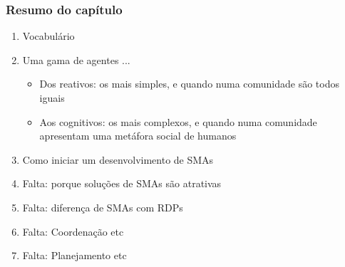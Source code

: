 
\begin{frame} %

 \frametitle{Resumo do capítulo}

\begin{enumerate}
  \item Vocabulário
  \item Uma gama de agentes ...
    \begin{itemize}
    \item Dos reativos: os mais simples, e quando numa comunidade são todos iguais
    \item Aos cognitivos: os mais complexos, e quando numa comunidade apresentam
    uma metáfora social de humanos
  \end{itemize}
  
  \item Como iniciar um desenvolvimento de SMAs 
  
  \item Falta: porque soluções de SMAs são atrativas
    \item Falta: diferença de SMAs com RDPs
    \item Falta: Coordenação etc
        \item Falta: Planejamento etc
    
\end{enumerate}


\end{frame}
